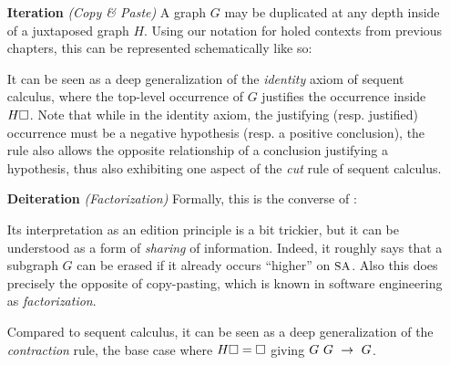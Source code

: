 \begin{itemize}
  \item[\textbf{Iteration} \textit{(Copy \& Paste)}]
    A graph $G$ may be duplicated at any depth inside of a juxtaposed graph $H$.
    Using our notation for holed contexts from previous chapters, this can be
    represented schematically like so:
    It can be seen as a deep generalization of the \emph{identity} axiom of
    sequent calculus, where the top-level occurrence of $G$ justifies the
    occurrence inside $H\square$. Note that while in the identity axiom, the justifying
    (resp. justified) occurrence must be a negative hypothesis (resp. a positive
    conclusion), the  rule also allows the opposite relationship
    of a conclusion justifying a hypothesis, thus also exhibiting one aspect of
    the \emph{cut} rule of sequent calculus.
  \item[\textbf{Deiteration} \textit{(Factorization)}]
    Formally, this is the converse of :
    Its interpretation as an edition principle is a bit trickier, but it can be
    understood as a form of \emph{sharing} of information. Indeed, it roughly
    says that a subgraph $G$ can be erased if it already occurs ``higher'' on
    $\small\textsc{SA}$. Also this does precisely the opposite of copy-pasting, which is known
    in software engineering as \emph{factorization}.
    
    Compared to sequent calculus, it can be seen as a deep generalization of the
    \emph{contraction} rule, the base case where $H\square = \square$ giving $G~G
    ~\rightarrow~ G$.
\end{itemize}
